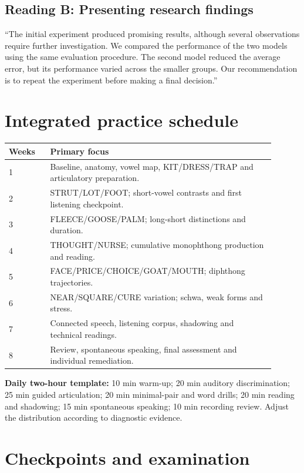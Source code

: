 \subsection{Reading B: Presenting research findings}
``The initial experiment produced promising results, although several observations require further investigation. We compared the performance of the two models using the same evaluation procedure. The second model reduced the average error, but its performance varied across the smaller groups. Our recommendation is to repeat the experiment before making a final decision.''
\section{Integrated practice schedule}
\begin{longtable}{p{0.14\linewidth}p{0.76\linewidth}}
\toprule Weeks & Primary focus\\\midrule\endhead
1 & Baseline, anatomy, vowel map, KIT/DRESS/TRAP and articulatory preparation.\\
2 & STRUT/LOT/FOOT; short-vowel contrasts and first listening checkpoint.\\
3 & FLEECE/GOOSE/PALM; long-short distinctions and duration.\\
4 & THOUGHT/NURSE; cumulative monophthong production and reading.\\
5 & FACE/PRICE/CHOICE/GOAT/MOUTH; diphthong trajectories.\\
6 & NEAR/SQUARE/CURE variation; schwa, weak forms and stress.\\
7 & Connected speech, listening corpus, shadowing and technical readings.\\
8 & Review, spontaneous speaking, final assessment and individual remediation.\\
\bottomrule\end{longtable}
\noindent\textbf{Daily two-hour template:} 10 min warm-up; 20 min auditory discrimination; 25 min guided articulation; 20 min minimal-pair and word drills; 20 min reading and shadowing; 15 min spontaneous speaking; 10 min recording review. Adjust the distribution according to diagnostic evidence.
\section{Checkpoints and examination}
